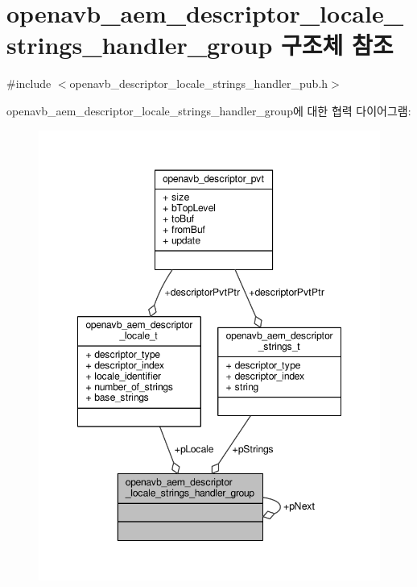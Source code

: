 \hypertarget{structopenavb__aem__descriptor__locale__strings__handler__group}{}\section{openavb\+\_\+aem\+\_\+descriptor\+\_\+locale\+\_\+strings\+\_\+handler\+\_\+group 구조체 참조}
\label{structopenavb__aem__descriptor__locale__strings__handler__group}


{\ttfamily \#include $<$openavb\+\_\+descriptor\+\_\+locale\+\_\+strings\+\_\+handler\+\_\+pub.\+h$>$}



openavb\+\_\+aem\+\_\+descriptor\+\_\+locale\+\_\+strings\+\_\+handler\+\_\+group에 대한 협력 다이어그램\+:
\nopagebreak
\begin{figure}[H]
\begin{center}
\leavevmode
\includegraphics[width=348pt]{structopenavb__aem__descriptor__locale__strings__handler__group__coll__graph}
\end{center}
\end{figure}
